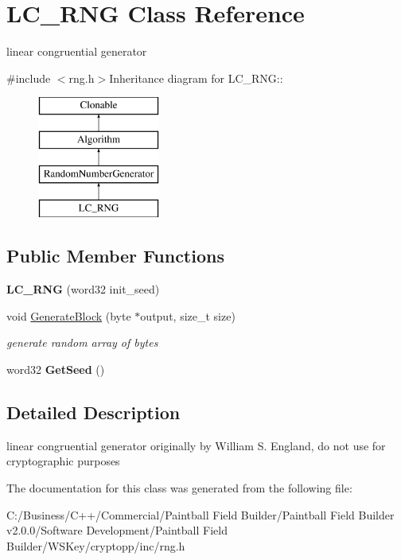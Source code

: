 \hypertarget{class_l_c___r_n_g}{
\section{LC\_\-RNG Class Reference}
\label{class_l_c___r_n_g}
}


linear congruential generator  


{\ttfamily \#include $<$rng.h$>$}Inheritance diagram for LC\_\-RNG::\begin{figure}[H]
\begin{center}
\leavevmode
\includegraphics[height=4cm]{class_l_c___r_n_g}
\end{center}
\end{figure}
\subsection*{Public Member Functions}
\begin{DoxyCompactItemize}
\item 
\hypertarget{class_l_c___r_n_g_a6d7df7fcc2da384b3dd5c9b8ac91cfef}{
{\bfseries LC\_\-RNG} (word32 init\_\-seed)}
\label{class_l_c___r_n_g_a6d7df7fcc2da384b3dd5c9b8ac91cfef}

\item 
\hypertarget{class_l_c___r_n_g_ab2f22bacb77dab778008f3301daa3ad6}{
void \hyperlink{class_l_c___r_n_g_ab2f22bacb77dab778008f3301daa3ad6}{GenerateBlock} (byte $\ast$output, size\_\-t size)}
\label{class_l_c___r_n_g_ab2f22bacb77dab778008f3301daa3ad6}

\begin{DoxyCompactList}\small\item\em generate random array of bytes \item\end{DoxyCompactList}\item 
\hypertarget{class_l_c___r_n_g_a16704fc7e2b63be84e73e47c10db2f06}{
word32 {\bfseries GetSeed} ()}
\label{class_l_c___r_n_g_a16704fc7e2b63be84e73e47c10db2f06}

\end{DoxyCompactItemize}


\subsection{Detailed Description}
linear congruential generator originally by William S. England, do not use for cryptographic purposes 

The documentation for this class was generated from the following file:\begin{DoxyCompactItemize}
\item 
C:/Business/C++/Commercial/Paintball Field Builder/Paintball Field Builder v2.0.0/Software Development/Paintball Field Builder/WSKey/cryptopp/inc/rng.h\end{DoxyCompactItemize}

